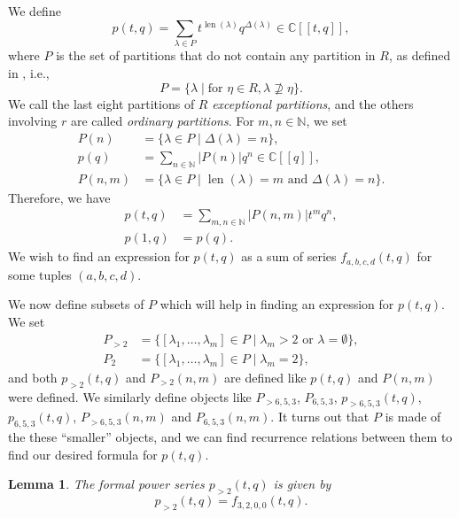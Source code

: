 \documentclass[a4paper, 12pt, reqno]{amsart}
\newtheorem{lemma}[theorem]{Lemma}
\theoremstyle{remark}
\numberwithin{equation}{subsection}
\DeclareMathOperator{\len}{len}
\begin{document}
We define
\begin{equation*}
  p(t, q) = \sum_{\lambda \in P}t^{\len(\lambda)}q^{\Delta(\lambda)} \in \mathbb{C}[[t, q]],
\end{equation*}
where $P$ is the set of partitions that do not contain any partition in $R$, as defined in , i.e.,
\begin{equation*}
  P = \{\lambda \mid \text{for }\eta \in R, \lambda \nsupseteq \eta\}.
\end{equation*}
We call the last eight partitions of $R$ \emph{exceptional partitions}, and the others involving $r$ are called \emph{ordinary partitions}.
For $m, n \in \mathbb{N}$, we set
\begin{align*}
  P(n) &= \{\lambda \in P \mid \Delta(\lambda) = n\}, \\
  p(q) &= \sum_{n \in \mathbb{N}}|P(n)|q^n \in \mathbb{C}[[q]], \\
  P(n, m) &= \{\lambda \in P \mid \len(\lambda) = m\text{ and }\Delta(\lambda) = n\}.
\end{align*}
Therefore, we have
\begin{align*}
  p(t, q) &= \sum_{m, n \in \mathbb{N}}|P(n, m)|t^mq^n, \\
  p(1, q) &= p(q).
\end{align*}
We wish to find an expression for $p(t, q)$ as a sum of series $f_{a, b, c, d}(t, q)$ for some tuples $(a, b, c, d)$.

We now define subsets of $P$ which will help in finding an expression for $p(t, q)$.
We set
\begin{align*}
  P_{>2} &= \{[\lambda_1, \dots, \lambda_m] \in P \mid \lambda_m > 2\text{ or }\lambda = \emptyset\}, \\
  P_2 &= \{[\lambda_1, \dots, \lambda_m] \in P \mid \lambda_m = 2\},
\end{align*}
and both $p_{>2}(t, q)$ and $P_{>2}(n, m)$ are defined like $p(t, q)$ and $P(n, m)$ were defined.
We similarly define objects like $P_{>6, 5, 3}$, $P_{6, 5, 3}$, $p_{>6, 5, 3}(t, q)$, $p_{6, 5, 3}(t, q)$, $P_{>6, 5, 3}(n, m)$ and $P_{6, 5, 3}(n, m)$.
It turns out that $P$ is made of the these ``smaller'' objects, and we can find recurrence relations between them to find our desired formula for $p(t, q)$.

\begin{lemma}
  \label{lmm:26}
  The formal power series $p_{>2}(t, q)$ is given by
  \begin{equation*}
    p_{>2}(t, q) = f_{3, 2, 0, 0}(t, q).
  \end{equation*}
\end{lemma}
\end{document}
